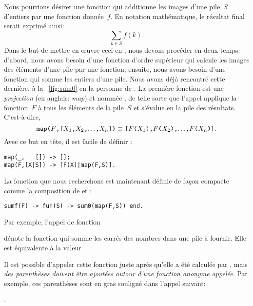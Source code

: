 Nous pourrions désirer une fonction qui additionne les images d'une
pile~\(S\) d'entiers par une fonction donnée~\(f\). En notation
mathématique, le résultat final serait exprimé ainsi:
\begin{equation*}
\sum_{k \in S}{f(k)}.
\end{equation*}
Dans le but de mettre en œuvre ceci en \Erlang, nous devons
procéder en deux temps: d'abord, nous avons besoin d'une fonction
d'ordre supérieur qui calcule les images des éléments d'une pile par
une fonction; ensuite, nous avons besoin d'une fonction qui somme les
entiers d'une pile. Nous avons déjà rencontré cette dernière, à la
\fig~\vref{fig:sum0} en la personne de . La première
fonction est une \emph{projection} (en anglais: \emph{map}) et nommée
, de telle sorte que l'appel 
applique la fonction~\(F\) à tous les éléments de la pile~\(S\) et
s'évalue en la pile des résultats. C'est-à-dire,
\begin{equation*}
\texttt{map(\(F\),[\(X_1\),\(X_2\),\(\ldots\),\(X_{n}\)])}
\equiv
\texttt{[\(F\)(\(X_1\)),\(F\)(\(X_2\)),\(\ldots\),\(F\)(\(X_{n}\))]}.
\end{equation*}
Avec ce but en tête, il est facile de définir :
\begin{verbatim}
map(_,   []) -> [];
map(F,[X|S]) -> [F(X)|map(F,S)].
\end{verbatim}
La fonction que nous recherchons est maintenant définie de façon
compacte comme la composition de  et :
\begin{verbatim}
sumf(F) -> fun(S) -> sum0(map(F,S)) end.
\end{verbatim}
Par exemple, l'appel de fonction
\begin{center}
\end{center}
dénote la fonction qui somme les carrés des nombres dans une pile à
fournir. Elle est équivalente à la valeur
\begin{center}
\end{center}
Il est possible d'appeler cette fonction juste après qu'elle a été
calculée par , mais \emph{des parenthèses doivent être
  ajoutées autour d'une fonction anonyme appelée}. Par exemple, ces
parenthèses sont en gras souligné dans l'appel suivant:
\begin{center}
.
\end{center}
